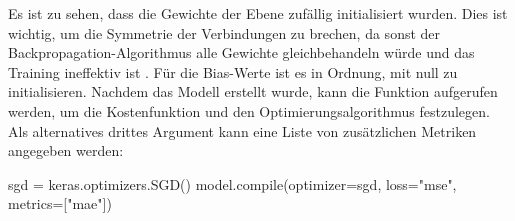 Es ist zu sehen, dass die Gewichte der Ebene zufällig initialisiert wurden.
Dies ist wichtig, um die Symmetrie der Verbindungen zu brechen,
da sonst der Backpropagation-Algorithmus alle Gewichte gleichbehandeln würde
und das Training ineffektiv ist \parencite[291]{book:hands-on-ml}.
Für die Bias-Werte ist es in Ordnung, mit null zu initialisieren.
Nachdem das Modell erstellt wurde, kann die 
Funktion aufgerufen werden, um die Kostenfunktion und den
Optimierungsalgorithmus festzulegen.
Als alternatives drittes Argument kann eine Liste von
zusätzlichen Metriken angegeben werden:
\begin{pythoncode}
sgd = keras.optimizers.SGD()
model.compile(optimizer=sgd, loss="mse", metrics=["mae"])
\end{pythoncode}
